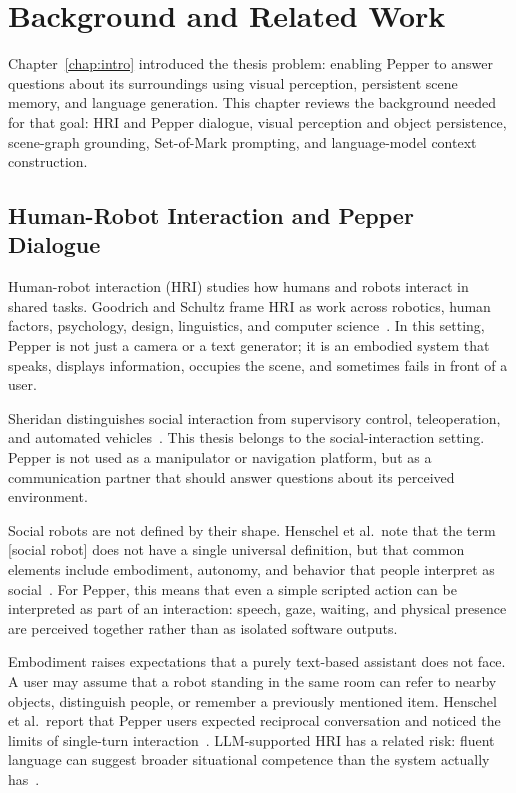 \chapter{Background and Related Work}\label{chap:background}

Chapter~\ref{chap:intro} introduced the thesis problem: enabling Pepper to answer questions about its surroundings using visual perception, persistent scene memory, and language generation. This chapter reviews the background needed for that goal: HRI and Pepper dialogue, visual perception and object persistence, scene-graph grounding, Set-of-Mark prompting, and language-model context construction.

\section{Human-Robot Interaction and Pepper Dialogue}\label{sec:hri-social-robots}

Human-robot interaction (HRI) studies how humans and robots interact in shared tasks. Goodrich and Schultz frame HRI as work across robotics, human factors, psychology, design, linguistics, and computer science~\cite[203--216]{goodrich_human-robot_2007}. In this setting, Pepper is not just a camera or a text generator; it is an embodied system that speaks, displays information, occupies the scene, and sometimes fails in front of a user.

Sheridan distinguishes social interaction from supervisory control, teleoperation, and automated vehicles~\cite[525--526]{Sheridan2016HRI}. This thesis belongs to the social-interaction setting. Pepper is not used as a manipulator or navigation platform, but as a communication partner that should answer questions about its perceived environment.

Social robots are not defined by their shape. Henschel et al.\ note that the term [social robot] does not have a single universal definition, but that common elements include embodiment, autonomy, and behavior that people interpret as social~\cite[11--12]{henschel_what_2021}. For Pepper, this means that even a simple scripted action can be interpreted as part of an interaction: speech, gaze, waiting, and physical presence are perceived together rather than as isolated software outputs.

Embodiment raises expectations that a purely text-based assistant does not face. A user may assume that a robot standing in the same room can refer to nearby objects, distinguish people, or remember a previously mentioned item. Henschel et al.\ report that Pepper users expected reciprocal conversation and noticed the limits of single-turn interaction~\cite[12]{henschel_what_2021}. LLM-supported HRI has a related risk: fluent language can suggest broader situational competence than the system actually has~\cite{kim_understanding_2024,aturhurra_leveraging_2024}.

